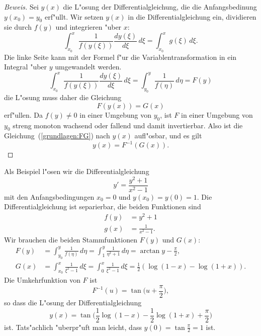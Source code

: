 \begin{proof}[Beweis]
Sei $y(x)$ die L"osung der Differentialgleichung, die die Anfangsbedinung
$y(x_0)=y_0$ erf"ullt.
Wir setzen $y(x)$ in die Differentialgleichung ein,
dividieren sie durch $f(y)$ und integrieren "uber $x$:
\[
\int_{x_0}^x\frac1{f(y(\xi))}\frac{dy(\xi)}{d\xi}\,d\xi
=
\int_{x_0}^x g(\xi)\,d\xi.
\]
Die linke Seite kann mit der Formel f"ur die Variablentransformation in
ein Integral "uber $y$ umgewandelt werden.
\[
\int_{x_0}^x\frac1{f(y(\xi))}\frac{dy(\xi)}{d\xi}\,d\xi
=
\int_{y_0}^y \frac1{f(\eta)}\,d\eta=F(y)
\]
die L"osung muss daher die Gleichung
\begin{equation}
F(y(x))=G(x)
\label{grundlagen:FG}
\end{equation}
erf"ullen.
Da $f(y)\ne 0$ in einer Umgebung von $y_0$, ist $F$ in einer Umgebung von $y_0$
streng monoton wachsend oder fallend und damit invertierbar.
Also ist die Gleichung~(\ref{grundlagen:FG}) nach $y(x)$ aufl"osbar, und
es gilt
\[
y(x)=F^{-1}(G(x)).
\]
\end{proof}

\begin{beispiel}
Als Beispiel l"osen wir die Differentialgleichung
\[
y'=\frac{y^2+1}{x^2-1}
\]
mit den Anfangsbedingungen $x_0=0$ und $y(x_0)=y(0)=1$.
Die Differentialgleichung ist separierbar, die beiden Funktionen sind
\begin{align*}
f(y)&=y^2+1
\\
g(x)&=\frac1{x^2-1}.
\end{align*}
Wir brauchen die beiden Stammfunktionen $F(y)$ und $G(x)$:
\begin{align*}
F(y)
&=
\int_{y_0}^y \frac1{f(\eta)}\,d\eta
=
\int_{1}^y \frac1{\eta^2+1}\,d\eta
=
\arctan y - \frac{\pi}2,
\\
G(x)
&=
\int_{x_0}^x\frac1{\xi^2-1}\,d\xi
=
\int_0^x \frac1{\xi^2-1}\,d\xi
=
\frac12(\log(1-x)-\log(1+x)).
\end{align*}
Die Umkehrfunktion von $F$ ist
\[
F^{-1}(u)=\tan\biggl(u+\frac{\pi}2\biggr),
\]
so dass die L"osung der Differentialgleichung
\[
y(x)=
\tan\biggl(\frac12\log(1-x)-\frac12\log(1+x)+\frac{\pi}2\biggr)
\]
ist.
Tats"achlich "uberpr"uft man leicht, dass $y(0)=\tan\frac{\pi}2=1$ ist.
\end{beispiel}

